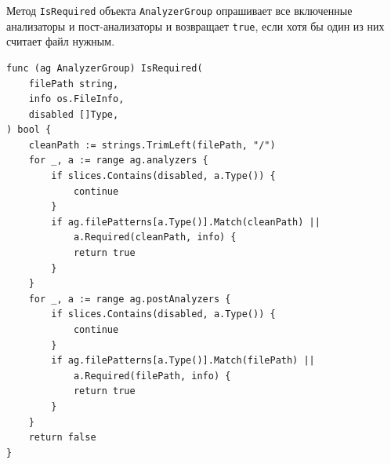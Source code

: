 \label{sec:Apendix} 


\flushleft
\noindent Метод \texttt{IsRequired} объекта \texttt{AnalyzerGroup} опрашивает все включенные анализаторы и пост-анализаторы и возвращает \texttt{true}, если хотя бы один из них считает файл нужным.

\lstset{
  frame=tb,
}
\label{app:isrequired}
\begin{lstlisting}
func (ag AnalyzerGroup) IsRequired(
    filePath string,
    info os.FileInfo,
    disabled []Type,
) bool {
    cleanPath := strings.TrimLeft(filePath, "/")
    for _, a := range ag.analyzers {
        if slices.Contains(disabled, a.Type()) {
            continue
        }
        if ag.filePatterns[a.Type()].Match(cleanPath) ||
            a.Required(cleanPath, info) {
            return true
        }
    }
    for _, a := range ag.postAnalyzers {
        if slices.Contains(disabled, a.Type()) {
            continue
        }
        if ag.filePatterns[a.Type()].Match(filePath) ||
            a.Required(filePath, info) {
            return true
        }
    }
    return false
}
\end{lstlisting}
